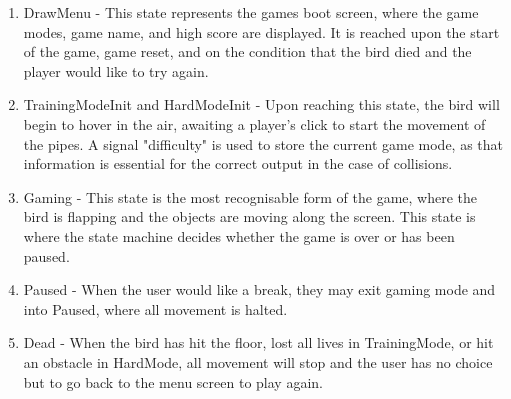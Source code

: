 \documentclass[conference]{IEEEtran}
\begin{document}
\begin{enumerate}
    \item DrawMenu - This state represents the games boot screen, where the game modes, game name, and high score are displayed. It is reached upon the start of the game, game reset, and on the condition that the bird died and the player would like to try again.
    \item TrainingModeInit and HardModeInit - Upon reaching this state, the bird will begin to hover in the air, awaiting a player's click to start the movement of the pipes. A signal "difficulty" is used to store the current game mode, as that information is essential for the correct output in the case of collisions.
    \item Gaming - This state is the most recognisable form of the game, where the bird is flapping and the objects are moving along the screen. This state is where the state machine decides whether the game is over or has been paused.
    \item Paused - When the user would like a break, they may exit gaming mode and into Paused, where all movement is halted.
    \item Dead - When the bird has hit the floor, lost all lives in TrainingMode, or hit an obstacle in HardMode, all movement will stop and the user has no choice but to go back to the menu screen to play again.
\end{enumerate}
\end{document}
